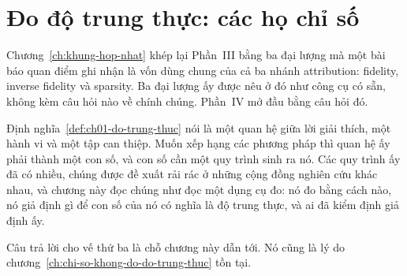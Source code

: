 %
%
\chapter{Đo độ trung thực: các họ chỉ số}
\label{ch:do-do-trung-thuc}

Chương~\ref{ch:khung-hop-nhat} khép lại Phần~III bằng ba đại lượng mà một bài
báo quan điểm ghi nhận là vốn dùng chung của cả ba nhánh attribution: fidelity,
inverse fidelity và sparsity. Ba đại lượng ấy được nêu ở đó như công cụ có sẵn,
không kèm câu hỏi nào về chính chúng. Phần~IV mở đầu bằng câu hỏi đó.

Định nghĩa~\ref{def:ch01-do-trung-thuc} nói  là
một quan hệ giữa lời giải thích, một hành vi và một tập can thiệp. Muốn xếp hạng
các phương pháp thì quan hệ ấy phải thành một con số, và con số cần một quy
trình sinh ra nó. Các quy trình ấy đã có nhiều, chúng được đề xuất rải rác ở
những cộng đồng nghiên cứu khác nhau, và
chương này đọc chúng như đọc một dụng cụ đo: nó đo bằng cách nào, nó giả định gì
để con số của nó có nghĩa là độ trung thực, và ai đã kiểm định giả định ấy.

Câu trả lời cho vế thứ ba là chỗ chương này dẫn tới. Nó cũng là lý do
chương~\ref{ch:chi-so-khong-do-do-trung-thuc} tồn tại.









